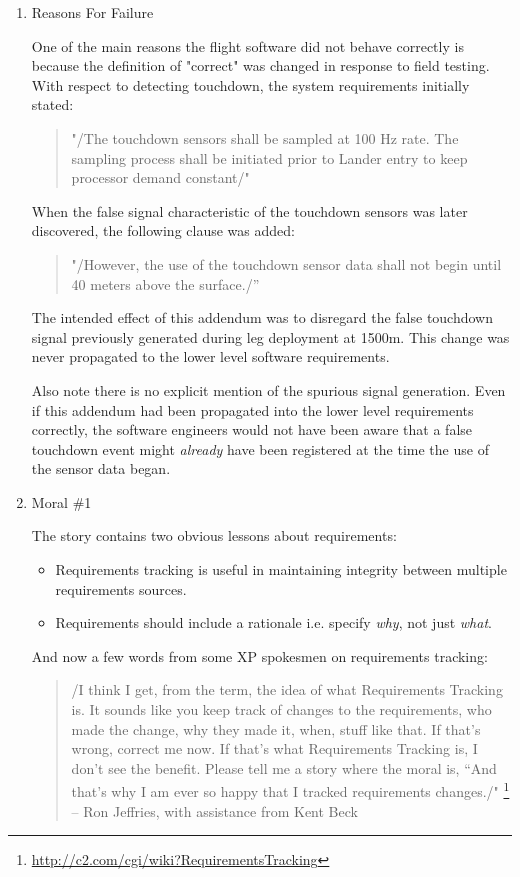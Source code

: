 \documentclass{article}
\begin{document}
\begin{enumerate}
\item Reasons For Failure
\label{sec:orgheadline224}

One of the main reasons the flight software did not behave correctly is
because the definition of "correct" was changed in response to field
testing. With respect to detecting touchdown, the system requirements
initially stated:

\begin{quote}
"/The touchdown sensors shall be sampled at 100 Hz rate. The sampling
process shall be initiated prior to Lander entry to keep processor
demand constant/"
\end{quote}

When the false signal characteristic of the touchdown sensors was later
discovered, the following clause was added:

\begin{quote}
"/However, the use of the touchdown sensor data shall not begin until
40 meters above the surface./”
\end{quote}

The intended effect of this addendum was to disregard the false
touchdown signal previously generated during leg deployment at 1500m.
This change was never propagated to the lower level software
requirements.

Also note there is no explicit mention of the spurious signal
generation. Even if this addendum had been propagated into the lower
level requirements correctly, the software engineers would not have been
aware that a false touchdown event might \emph{already} have been registered
at the time the use of the sensor data began.

\item Moral \#1
\label{sec:orgheadline225}

The story contains two obvious lessons about requirements:

\begin{itemize}
\item Requirements tracking is useful in maintaining integrity between
multiple requirements sources.\\
\item Requirements should include a rationale i.e. specify \emph{why}, not just
\emph{what}.
\end{itemize}

And now a few words from some XP spokesmen on requirements tracking:

\begin{quote}
/I think I get, from the term, the idea of what Requirements Tracking
is. It sounds like you keep track of changes to the requirements, who
made the change, why they made it, when, stuff like that. If that's
wrong, correct me now. If that's what Requirements Tracking is, I
don't see the benefit. Please tell me a story where the moral is, “And
that's why I am ever so happy that I tracked requirements
changes./" \footnote{\url{http://c2.com/cgi/wiki?RequirementsTracking}} -- Ron Jeffries, with assistance from Kent Beck
\end{quote}


\end{enumerate}
\end{document}
